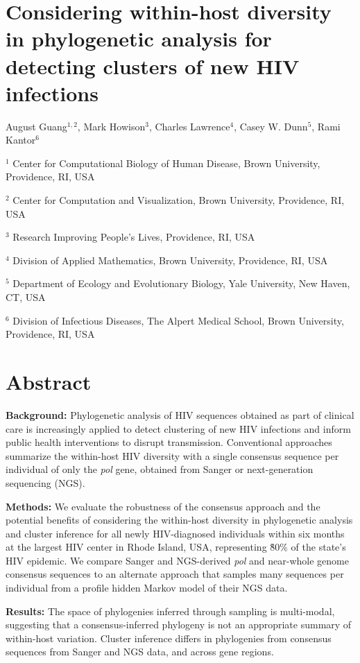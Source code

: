 \documentclass[letterpaper]{article}
\begin{document}
\section*{Considering within-host diversity in phylogenetic analysis for detecting clusters of new HIV infections}

August Guang$^{1,2}$, Mark Howison$^3$, Charles Lawrence$^4$, Casey W. Dunn$^5$, Rami Kantor$^6$

$^1$ Center for Computational Biology of Human Disease, Brown University, Providence, RI, USA

$^2$ Center for Computation and Visualization, Brown University, Providence, RI, USA

$^3$ Research Improving People's Lives, Providence, RI, USA

$^4$ Division of Applied Mathematics, Brown University, Providence, RI, USA

$^5$ Department of Ecology and Evolutionary Biology, Yale University, New Haven, CT, USA

$^6$ Division of Infectious Diseases, The Alpert Medical School, Brown University, Providence, RI, USA

\doublespace
\section*{Abstract}

\textbf{Background:} Phylogenetic analysis of HIV sequences obtained as part of clinical care is increasingly applied to detect clustering of new HIV infections and inform public health interventions to disrupt transmission. Conventional approaches summarize the within-host HIV diversity with a single consensus sequence per individual of only the \emph{pol} gene, obtained from Sanger or next-generation sequencing (NGS).

\textbf{Methods:} We evaluate the robustness of the consensus approach and the potential benefits of considering the within-host diversity in phylogenetic analysis and cluster inference for all newly HIV-diagnosed individuals within six months at the largest HIV center in Rhode Island, USA, representing \~80\% of the state's HIV epidemic. We compare Sanger and NGS-derived \emph{pol} and near-whole genome consensus sequences to an alternate approach that samples many sequences per individual from a profile hidden Markov model of their NGS data.

\textbf{Results:} The space of phylogenies inferred through sampling is multi-modal, suggesting that a consensus-inferred phylogeny is not an appropriate summary of within-host variation. Cluster inference differs in phylogenies from consensus sequences from Sanger and NGS data, and across gene regions.
\end{document}
